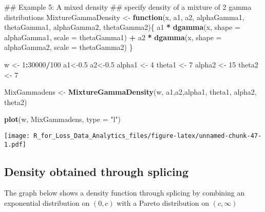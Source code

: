 \documentclass[]{book}
\newenvironment{Shaded}{\begin{snugshade}}{\end{snugshade}}
\newcommand{\KeywordTok}[1]{\textcolor[rgb]{0.13,0.29,0.53}{\textbf{#1}}}
\newcommand{\DataTypeTok}[1]{\textcolor[rgb]{0.13,0.29,0.53}{#1}}
\newcommand{\DecValTok}[1]{\textcolor[rgb]{0.00,0.00,0.81}{#1}}
\newcommand{\FloatTok}[1]{\textcolor[rgb]{0.00,0.00,0.81}{#1}}
\newcommand{\StringTok}[1]{\textcolor[rgb]{0.31,0.60,0.02}{#1}}
\newcommand{\ControlFlowTok}[1]{\textcolor[rgb]{0.13,0.29,0.53}{\textbf{#1}}}
\newcommand{\OperatorTok}[1]{\textcolor[rgb]{0.81,0.36,0.00}{\textbf{#1}}}
\newcommand{\NormalTok}[1]{#1}
\theoremstyle{definition}
\theoremstyle{definition}
\theoremstyle{definition}
\theoremstyle{remark}
\begin{document}
\begin{Shaded}
\begin{Highlighting}[]
\NormalTok{## Example 5: A mixed density}
\NormalTok{## specify density of a mixture of 2 gamma distributions}
\NormalTok{MixtureGammaDensity <-}\StringTok{ }\ControlFlowTok{function}\NormalTok{(x, a1, a2, alphaGamma1, thetaGamma1, alphaGamma2, thetaGamma2)\{}
\NormalTok{  a1 }\OperatorTok{*}\StringTok{ }\KeywordTok{dgamma}\NormalTok{(x, }\DataTypeTok{shape =}\NormalTok{ alphaGamma1, }\DataTypeTok{scale =}\NormalTok{ thetaGamma1) }\OperatorTok{+}\StringTok{ }\NormalTok{a2 }\OperatorTok{*}\StringTok{ }\KeywordTok{dgamma}\NormalTok{(x, }\DataTypeTok{shape =}\NormalTok{ alphaGamma2, }\DataTypeTok{scale =}\NormalTok{ thetaGamma2)}
\NormalTok{\}}

\NormalTok{w <-}\StringTok{ }\DecValTok{1}\OperatorTok{:}\DecValTok{30000}\OperatorTok{/}\DecValTok{100}
\NormalTok{a1<-}\FloatTok{0.5}
\NormalTok{a2<-}\FloatTok{0.5}
\NormalTok{alpha1 <-}\StringTok{ }\DecValTok{4}
\NormalTok{theta1 <-}\StringTok{ }\DecValTok{7}
\NormalTok{alpha2 <-}\StringTok{ }\DecValTok{15}
\NormalTok{theta2 <-}\StringTok{ }\DecValTok{7}

\NormalTok{MixGammadens <-}\StringTok{ }\KeywordTok{MixtureGammaDensity}\NormalTok{(w, a1,a2,alpha1, theta1, alpha2, theta2)}

\KeywordTok{plot}\NormalTok{(w, MixGammadens, }\DataTypeTok{type =} \StringTok{"l"}\NormalTok{)}
\end{Highlighting}
\end{Shaded}

\texttt{[image: R\_for\_Loss\_Data\_Analytics\_files/figure-latex/unnamed-chunk-47-1.pdf]}

\subsection{Density obtained through
splicing}\label{density-obtained-through-splicing}

The graph below shows a density function through splicing by combining
an exponential distribution on \((0,c)\) with a Pareto distribution on
\((c,\infty)\)
\end{document}

